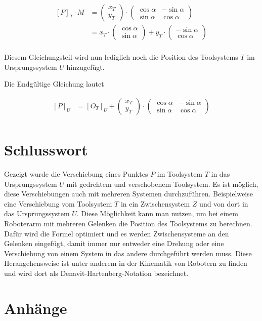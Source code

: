 \documentclass{article}
\newcommand{\m}[1]{\begin{pmatrix}#1\end{pmatrix}}
\begin{document}
    \[
        \begin{split}
            {[P]}_{T} \cdot M &= \m{x_T \\ y_T} \cdot \m{\cos \alpha & - \sin \alpha \\ \sin \alpha & \cos \alpha} \\
            &= x_T \cdot \m{\cos \alpha \\ \sin \alpha} + y_T \cdot \m{- \sin \alpha \\ \cos \alpha} \\
        \end{split}
    \]

    Diesem Gleichungsteil wird nun lediglich noch die Position des Toolsystems $T$ im Ursprungssystem $U$ hinzugefügt.

    Die Endgültige Gleichung lautet

    \[
        \begin{split}
            {[P]}_U &= {[O_T]}_U + \m{x_T \\ y_T} \cdot \m{\cos \alpha & - \sin \alpha \\ \sin \alpha & \cos \alpha} \\
        \end{split}
    \]

    \newpage{}

    \section{Schlusswort}

    Gezeigt wurde die Verschiebung eines Punktes $P$ im Toolsystem $T$ in das Ursprungssystem $U$
    mit gedrehtem und verschobenem Toolsystem.
    Es ist möglich, diese Verschiebungen auch mit mehreren Systemen durchzuführen. Beispielweise
    eine Verschiebung vom Toolsystem $T$ in ein Zwischensystem $Z$ und von dort in das Ursprungssystem $U$.
    Diese Möglichkeit kann man nutzen, um bei einem Roboterarm mit mehreren Gelenken die Position
    des Toolsystems zu berechnen. Dafür wird die Formel optimiert und es werden Zwischensysteme an den Gelenken
    eingefügt, damit immer nur entweder eine Drehung oder eine Verschiebung von einem System in das andere
    durchgeführt werden muss. Diese Herangehensweise ist unter anderem in der Kinematik von Robotern
    zu finden und wird dort als Denavit-Hartenberg-Notation bezeichnet.
    


    \newpage

    \section{Anhänge}
\end{document}

